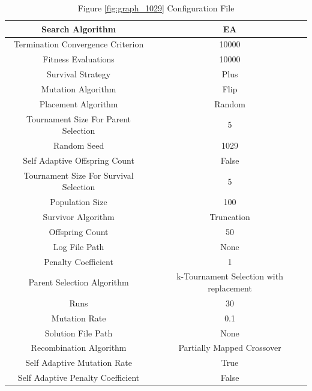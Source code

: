 \documentclass{standalone}
\begin{document}
\begin{table}[!htb]
	\centering
	\caption{Figure \ref{fig:graph_1029} Configuration File}
	\label{tab:graph_1029}
	\begin{tabular}{| c | c |}
		\hline
		Search Algorithm		& EA		 \\
		\hline
		Termination Convergence Criterion		& 10000		 \\
		\hline
		Fitness Evaluations		& 10000		 \\
		\hline
		Survival Strategy		& Plus		 \\
		\hline
		Mutation Algorithm		& Flip		 \\
		\hline
		Placement Algorithm		& Random		 \\
		\hline
		Tournament Size For Parent Selection		& 5		 \\
		\hline
		Random Seed		& 1029		 \\
		\hline
		Self Adaptive Offspring Count		& False		 \\
		\hline
		Tournament Size For Survival Selection		& 5		 \\
		\hline
		Population Size		& 100		 \\
		\hline
		Survivor Algorithm		& Truncation		 \\
		\hline
		Offspring Count		& 50		 \\
		\hline
		Log File Path		& None		 \\
		\hline
		Penalty Coefficient		& 1		 \\
		\hline
		Parent Selection Algorithm		& k-Tournament Selection with replacement		 \\
		\hline
		Runs		& 30		 \\
		\hline
		Mutation Rate		& 0.1		 \\
		\hline
		Solution File Path		& None		 \\
		\hline
		Recombination Algorithm		& Partially Mapped Crossover		 \\
		\hline
		Self Adaptive Mutation Rate		& True		 \\
		\hline
		Self Adaptive Penalty Coefficient		& False		 \\
		\hline
	\end{tabular}
\end{table}
\end{document}
